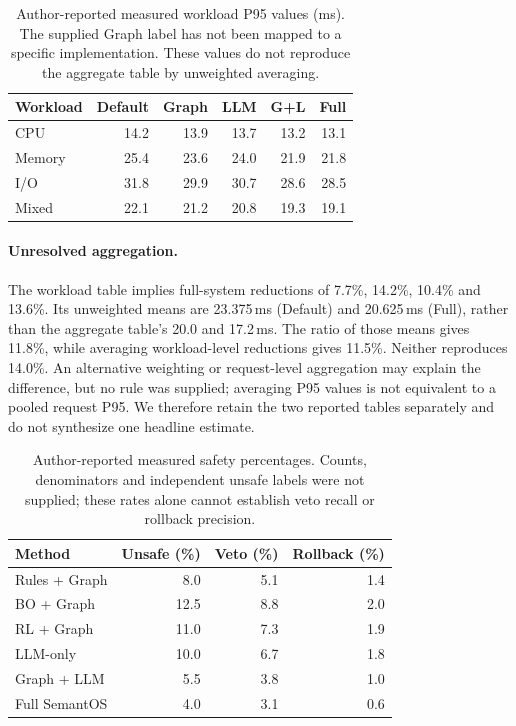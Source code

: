 \begin{table}[t]
\centering\small
\caption{Author-reported measured workload P95 values (ms). The supplied Graph label has not been mapped to a specific implementation. These values do not reproduce the aggregate table by unweighted averaging.}
\label{tab:reference-workloads}
\begin{tabular}{lrrrrr}
\toprule
Workload & Default & Graph & LLM & G+L & Full \\
\midrule
CPU & 14.2 & 13.9 & 13.7 & 13.2 & 13.1 \\
Memory & 25.4 & 23.6 & 24.0 & 21.9 & 21.8 \\
I/O & 31.8 & 29.9 & 30.7 & 28.6 & 28.5 \\
Mixed & 22.1 & 21.2 & 20.8 & 19.3 & 19.1 \\
\bottomrule
\end{tabular}
\end{table}
\paragraph{Unresolved aggregation.}
The workload table implies full-system reductions of 7.7\%, 14.2\%, 10.4\% and 13.6\%. Its unweighted means are 23.375\,ms (Default) and 20.625\,ms (Full), rather than the aggregate table's 20.0 and 17.2\,ms. The ratio of those means gives 11.8\%, while averaging workload-level reductions gives 11.5\%. Neither reproduces 14.0\%. An alternative weighting or request-level aggregation may explain the difference, but no rule was supplied; averaging P95 values is not equivalent to a pooled request P95. We therefore retain the two reported tables separately and do not synthesize one headline estimate.

\begin{table}[t]
\centering\small
\caption{Author-reported measured safety percentages. Counts, denominators and independent unsafe labels were not supplied; these rates alone cannot establish veto recall or rollback precision.}
\label{tab:reference-safety}
\begin{tabular}{lrrr}
\toprule
Method & Unsafe (\%) & Veto (\%) & Rollback (\%) \\
\midrule
Rules + Graph & 8.0 & 5.1 & 1.4 \\
BO + Graph & 12.5 & 8.8 & 2.0 \\
RL + Graph & 11.0 & 7.3 & 1.9 \\
LLM-only & 10.0 & 6.7 & 1.8 \\
Graph + LLM & 5.5 & 3.8 & 1.0 \\
Full SemantOS & 4.0 & 3.1 & 0.6 \\
\bottomrule
\end{tabular}
\end{table}
